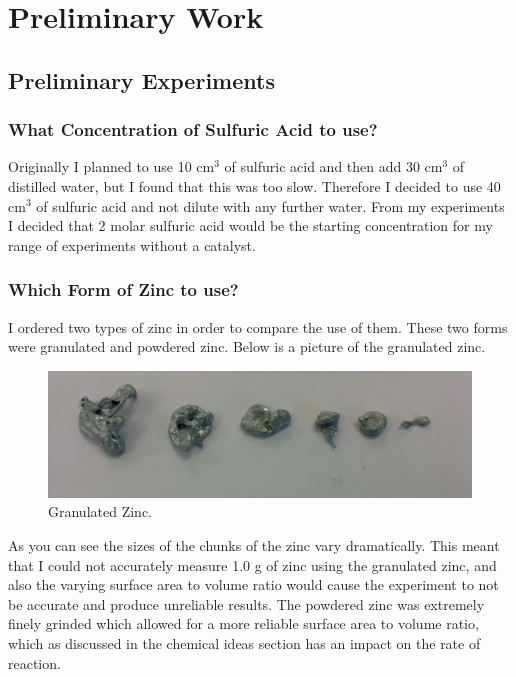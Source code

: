 \chapter {Preliminary Work} %

\section {Preliminary Experiments}

	\subsection {What Concentration of Sulfuric Acid to use?}

Originally I planned to use 10 cm$^3$ of sulfuric acid and then add 30 cm$^3$ of distilled water, but I found that this was too slow. Therefore I decided to use 40 cm$^3$ of sulfuric acid and not dilute with any further water. From my experiments I decided that 2 molar sulfuric acid would be the starting concentration for my range of experiments without a catalyst.









	\subsection{Which Form of Zinc to use?}

I ordered two types of zinc in order to compare the use of them. These two forms were granulated and powdered zinc. Below is a picture of the granulated zinc.

\begin{figure}[H]
    \includegraphics[width=\textwidth]{./preliminarywork/images/GranulatedZinc.jpg}
    \caption{Granulated Zinc.} \label{fig:Granulated Zinc}
\end{figure}

As you can see the sizes of the chunks of the zinc vary dramatically. This meant that I could not accurately measure 1.0 g of zinc using the granulated zinc, and also the varying surface area to volume ratio would cause the experiment to not be accurate and produce unreliable results. The powdered zinc was extremely finely grinded which allowed for a more reliable surface area to volume ratio, which as discussed in the chemical ideas section has an impact on the rate of reaction.



